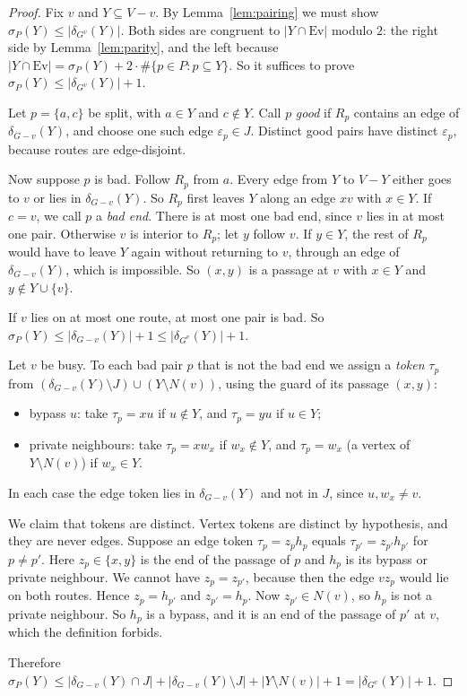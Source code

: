 \documentclass[11pt]{amsart}
\theoremstyle{definition}
\newcommand{\Ev}{\mathrm{Ev}}
\begin{document}
\begin{proof}
Fix $v$ and $Y\subseteq V-v$. By Lemma~\ref{lem:pairing} we must show
$\sigma_P(Y)\le|\delta_{G^v}(Y)|$. Both sides are congruent to $|Y\cap\Ev|$ modulo $2$: the right side
by Lemma~\ref{lem:parity}, and the left because $|Y\cap\Ev|=\sigma_P(Y)+2\cdot\#\{p\in P:p\subseteq
Y\}$. So it suffices to prove $\sigma_P(Y)\le|\delta_{G^v}(Y)|+1$.

Let $p=\{a,c\}$ be split, with $a\in Y$ and $c\notin Y$. Call $p$ \emph{good} if $R_p$ contains an
edge of $\delta_{G-v}(Y)$, and choose one such edge $\varepsilon_p\in J$. Distinct good pairs have
distinct $\varepsilon_p$, because routes are edge-disjoint.

Now suppose $p$ is bad. Follow $R_p$ from $a$. Every edge from $Y$ to $V-Y$ either goes to $v$ or lies
in $\delta_{G-v}(Y)$. So $R_p$ first leaves $Y$ along an edge $xv$ with $x\in Y$. If $c=v$, we call
$p$ a \emph{bad end}. There is at most one bad end, since $v$ lies in at most one pair. Otherwise $v$
is interior to $R_p$; let $y$ follow $v$. If $y\in Y$, the rest of $R_p$ would have to leave $Y$
again without returning to $v$, through an edge of $\delta_{G-v}(Y)$, which is impossible. So
$(x,y)$ is a passage at $v$ with $x\in Y$ and $y\notin Y\cup\{v\}$.

If $v$ lies on at most one route, at most one pair is bad. So
$\sigma_P(Y)\le|\delta_{G-v}(Y)|+1\le|\delta_{G^v}(Y)|+1$.

Let $v$ be busy. To each bad pair $p$ that is not the bad end we assign a \emph{token} $\tau_p$ from
$(\delta_{G-v}(Y)\setminus J)\cup(Y\setminus N(v))$, using the guard of its passage $(x,y)$:
\begin{itemize}
\item bypass $u$: take $\tau_p=xu$ if $u\notin Y$, and $\tau_p=yu$ if $u\in Y$;
\item private neighbours: take $\tau_p=xw_x$ if $w_x\notin Y$, and $\tau_p=w_x$ (a vertex of
$Y\setminus N(v)$) if $w_x\in Y$.
\end{itemize}
In each case the edge token lies in $\delta_{G-v}(Y)$ and not in $J$, since $u,w_x\ne v$.

We claim that tokens are distinct. Vertex tokens are distinct by hypothesis, and they are never
edges. Suppose an edge token $\tau_p=z_ph_p$ equals $\tau_{p'}=z_{p'}h_{p'}$ for $p\neq p'$. Here
$z_p\in\{x,y\}$ is the end of the passage of $p$ and $h_p$ is its bypass or private neighbour. We
cannot have $z_p=z_{p'}$, because then the edge $vz_p$ would lie on both routes. Hence $z_p=h_{p'}$
and $z_{p'}=h_p$. Now $z_{p'}\in N(v)$, so $h_p$ is not a private neighbour. So $h_p$ is a bypass,
and it is an end of the passage of $p'$ at $v$, which the definition forbids.

Therefore
$\sigma_P(Y)\le|\delta_{G-v}(Y)\cap J|+|\delta_{G-v}(Y)\setminus J|+|Y\setminus N(v)|+1
=|\delta_{G^v}(Y)|+1$.
\end{proof}
\end{document}
